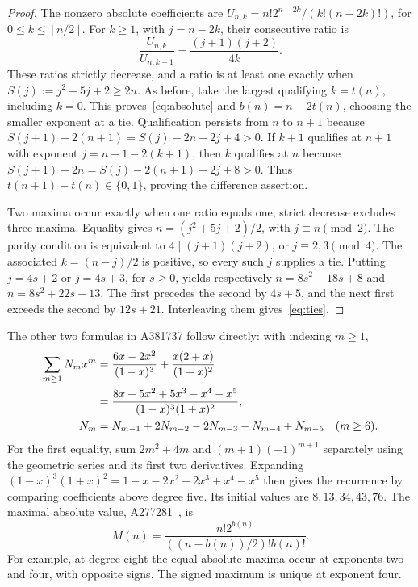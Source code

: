 \documentclass[11pt]{article}
\newcommand{\floor}[1]{\left\lfloor #1\right\rfloor}
\begin{document}
\begin{proof}
The nonzero absolute coefficients are
$U_{n,k}=n!2^{n-2k}/(k!(n-2k)!)$, for $0\leq k\leq\floor{n/2}$.
For $k\geq1$, with $j=n-2k$, their consecutive ratio is
\[
 \frac{U_{n,k}}{U_{n,k-1}}=\frac{(j+1)(j+2)}{4k}.
\]
These ratios strictly decrease, and a ratio is at least one exactly
when $S(j):=j^2+5j+2\geq2n$. As before, take the largest qualifying
$k=t(n)$, including $k=0$. This proves~\eqref{eq:absolute} and
$b(n)=n-2t(n)$, choosing the smaller exponent at a tie.
Qualification persists from $n$ to $n+1$ because
$S(j+1)-2(n+1)=S(j)-2n+2j+4>0$.
If $k+1$ qualifies at $n+1$ with exponent $j=n+1-2(k+1)$,
then $k$ qualifies at $n$ because
$S(j+1)-2n=S(j)-2(n+1)+2j+8>0$.
Thus $t(n+1)-t(n)\in\{0,1\}$, proving the difference assertion.

Two maxima occur exactly when one ratio equals one; strict decrease
excludes three maxima. Equality gives
$n=(j^2+5j+2)/2$, with $j\equiv n\pmod2$.
The parity condition is equivalent to $4\mid(j+1)(j+2)$,
or $j\equiv2,3\pmod4$. The associated $k=(n-j)/2$
is positive, so every such $j$ supplies a tie.
Putting $j=4s+2$ or $j=4s+3$, for $s\geq0$, yields respectively
$n=8s^2+18s+8$ and $n=8s^2+22s+13$.
The first precedes the second by $4s+5$, and the next first exceeds
the second by $12s+21$. Interleaving them gives~\eqref{eq:ties}.
\end{proof}

The other two formulas in A381737 follow directly: with indexing $m\geq1$,
\begin{align}
 \sum_{m\geq1}N_mx^m
 &=\frac{6x-2x^2}{(1-x)^3}+\frac{x(2+x)}{(1+x)^2}\notag\\
 &=\frac{8x+5x^2+5x^3-x^4-x^5}{(1-x)^3(1+x)^2},\label{eq:gf}\\
 N_m&=N_{m-1}+2N_{m-2}-2N_{m-3}-N_{m-4}+N_{m-5}
 \quad(m\geq6).\label{eq:recurrence}
\end{align}
For the first equality, sum $2m^2+4m$ and $(m+1)(-1)^{m+1}$
separately using the geometric series and its first two derivatives.
Expanding $(1-x)^3(1+x)^2=1-x-2x^2+2x^3+x^4-x^5$
then gives the recurrence by comparing coefficients above degree five.
Its initial values are $8,13,34,43,76$.
The maximal absolute value, A277281~\cite{absolutevalue}, is
\begin{equation}\label{eq:absolutevalue}
 M(n)=\frac{n!2^{b(n)}}{((n-b(n))/2)!b(n)!}.
\end{equation}
For example, at degree eight the equal absolute maxima occur at exponents
two and four, with opposite signs. The signed maximum is unique at exponent four.
\end{document}

